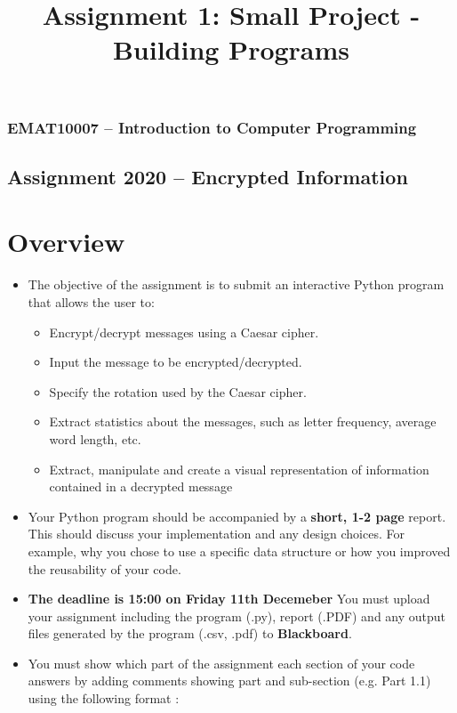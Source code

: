 \documentclass[11pt]{report}
\begin{document}
\title{Assignment 1: Small Project - Building Programs}
\subsubsection*{EMAT10007 -- Introduction to Computer Programming}
\subsection*{\Large Assignment 2020 -- Encrypted Information}

\section*{Overview}
\begin{itemize}
	\item The objective of the assignment is to submit an interactive Python program that allows the user to:
	\begin{itemize}
		\item Encrypt/decrypt messages using a Caesar cipher.
		\item Input the message to be encrypted/decrypted.
		\item Specify the rotation used by the Caesar cipher.
		\item Extract statistics about the messages, such as letter frequency, average word length, etc.
		\item Extract, manipulate and create a visual representation of information contained in a decrypted message 
	\end{itemize}
	\item Your Python program should be accompanied by a {\bf short, 1-2 page} report. This should discuss your implementation and any design choices. For example, why you chose to use a specific data structure or how you improved the reusability of your code. 
 	\item \textbf{The \textbf{deadline is 15:00 on Friday 11th Decemeber}} You must upload your assignment including the program (.py), report (.PDF) and any output files generated by the program (.csv, .pdf) to \textbf{Blackboard}.
	\item You must show which part of the assignment each section of your code answers by adding comments showing part and sub-section (e.g. Part 1.1) using the following format :


\end{itemize}
\end{document}
